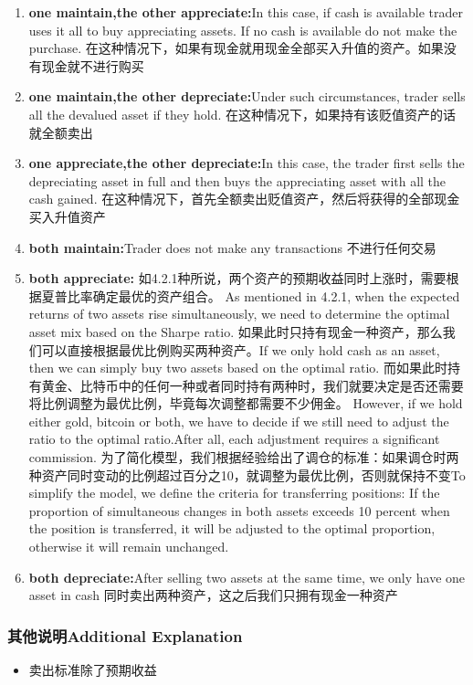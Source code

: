 \documentclass{mcmthesis}
\begin{document}
\begin{enumerate}
  \item \textbf{one maintain,the other appreciate:}In this case, if cash is available trader uses it all to buy appreciating assets. If no cash is available do not make the purchase.
  在这种情况下，如果有现金就用现金全部买入升值的资产。如果没有现金就不进行购买
  \item \textbf{one maintain,the other depreciate:}Under such circumstances, trader sells all the devalued asset if they hold.
  在这种情况下，如果持有该贬值资产的话就全额卖出
  \item \textbf{one appreciate,the other depreciate:}In this case, the trader first sells the depreciating asset in full and then buys the appreciating asset with all the cash gained.
  在这种情况下，首先全额卖出贬值资产，然后将获得的全部现金买入升值资产
  \item \textbf{both maintain:}Trader does not make any transactions
  不进行任何交易
    \item \textbf{both appreciate:}
  如4.2.1种所说，两个资产的预期收益同时上涨时，需要根据夏普比率确定最优的资产组合。
  As mentioned in 4.2.1, when the expected returns of two assets rise simultaneously, we need to determine the optimal asset mix based on the Sharpe ratio.
  如果此时只持有现金一种资产，那么我们可以直接根据最优比例购买两种资产。If we only hold cash as an asset, then we can simply buy two assets based on the optimal ratio.
  而如果此时持有黄金、比特币中的任何一种或者同时持有两种时，我们就要决定是否还需要将比例调整为最优比例，毕竟每次调整都需要不少佣金。
  However, if we hold either gold, bitcoin or both, we have to decide if we still need to adjust the ratio to the optimal ratio.After all, each adjustment requires a significant commission.
  为了简化模型，我们根据经验给出了调仓的标准：如果调仓时两种资产同时变动的比例超过百分之10，就调整为最优比例，否则就保持不变To simplify the model, we define the criteria for transferring positions:
  If the proportion of simultaneous changes in both assets exceeds 10 percent when the position is transferred, it will be adjusted to the optimal proportion, otherwise it will remain unchanged.
  
  \item\textbf{both depreciate:}After selling two assets at the same time, we only have one asset in cash
  同时卖出两种资产，这之后我们只拥有现金一种资产
\end{enumerate}

\subsubsection{其他说明Additional Explanation}
\begin{itemize}
  \item 卖出标准除了预期收益
\end{itemize}
\end{document}
